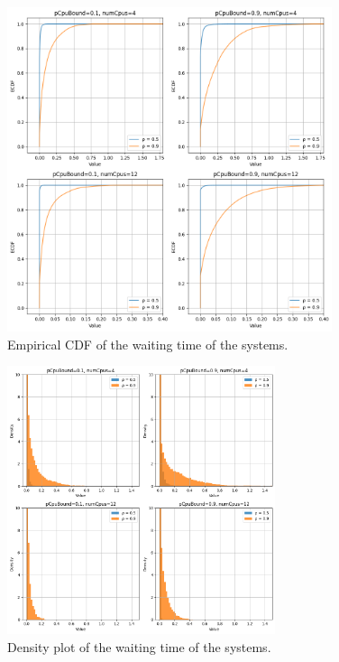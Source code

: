 \begin{figure}[H]
    \captionsetup{type=figure}
    \centering
    \includegraphics[width=0.85\textwidth]{./images/04/fcfs/wait/ecdf.png}
    \caption{Empirical CDF of the waiting time of the systems.}
    \label{fig:fcfsWaitEcdf}
\end{figure}

\begin{figure}[H]
    \captionsetup{type=figure}
    \centering
    \includegraphics[width=0.7\textwidth]{./images/04/fcfs/wait/density.png}
    \caption{Density plot of the waiting time of the systems.}
    \label{fig:fcfsWaitDensity}
\end{figure}

